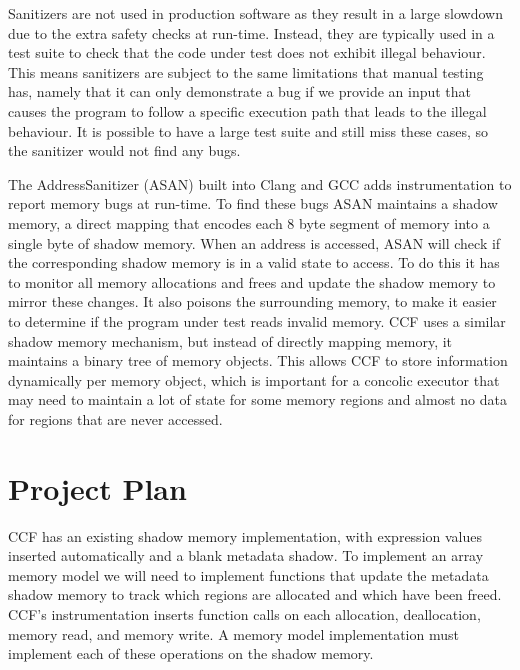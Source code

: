 \documentclass[12pt,twoside]{report}
\begin{document}
Sanitizers are not used in production software as they result in a large slowdown due to the extra safety checks at run-time. Instead, they are typically used in a test suite to check that the code under test does not exhibit illegal behaviour. This means sanitizers are subject to the same limitations that manual testing has, namely that it can only demonstrate a bug if we provide an input that causes the program to follow a specific execution path that leads to the illegal behaviour. It is possible to have a large test suite and still miss these cases, so the sanitizer would not find any bugs.

The AddressSanitizer \cite{180957} (ASAN) built into Clang and GCC adds instrumentation to report memory bugs at run-time. To find these bugs ASAN maintains a shadow memory, a direct mapping that encodes each 8 byte segment of memory into a single byte of shadow memory. When an address is accessed, ASAN will check if the corresponding shadow memory is in a valid state to access. To do this it has to monitor all memory allocations and frees and update the shadow memory to mirror these changes. It also poisons the surrounding memory, to make it easier to determine if the program under test reads invalid memory. CCF uses a similar shadow memory mechanism, but instead of directly mapping memory, it maintains a binary tree of memory objects. This allows CCF to store information dynamically per memory object, which is important for a concolic executor that may need to maintain a lot of state for some memory regions and almost no data for regions that are never accessed.

\chapter{Project Plan}

CCF has an existing shadow memory implementation, with expression values inserted automatically and a blank metadata shadow. To implement an array memory model we will need to implement functions that update the metadata shadow memory to track which regions are allocated and which have been freed. CCF's instrumentation inserts function calls on each allocation, deallocation, memory read, and memory write. A memory model implementation must implement each of these operations on the shadow memory.
\end{document}
